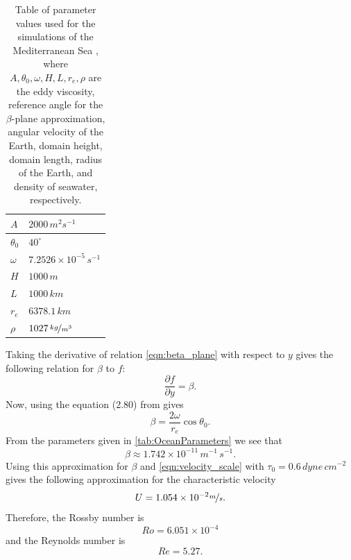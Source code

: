 \begin{table}
  \begin{center}
  \begin{tabular}{|l|l|}
    \hline
    $A$ & $2000\,m^2s^{-1}$\\
    \hline
    $\theta_0$ & $40^\circ$ \\
    \hline
    $\omega$ & $7.2526\times 10^{-5}\,s^{-1}$ \\
    \hline
    $H$ & $1000\,m$ \\
    \hline
    $L$ & $1000\,km$ \\
    \hline
    $r_e$ & $6378.1\,km$ \\
    \hline
    $\rho$ & $1027\, \nicefrac{kg}{m^3}$ \\
    \hline
  \end{tabular}
  \end{center}
  \caption{Table of parameter values used for the simulations of the
    Mediterranean Sea \cite{delSastre04}, where $A,\theta_0,\omega,H,L,r_e,\rho$ are the
    eddy viscosity, reference angle for the $\beta$-plane approximation, angular
    velocity of the Earth, domain height, domain length, radius of the Earth, and
    density of seawater, respectively.}
  \label{tab:OceanParameters}
\end{table}

Taking the derivative of relation \eqref{eqn:beta_plane} with respect to $y$
gives the following relation for $\beta$ to $f$:
\begin{equation}
  \frac{\partial f}{\partial y} = \beta. \label{eqn:dfdy}
\end{equation}
Now, using the equation (2.80) from \cite{Vallis} gives
\begin{equation}
  \beta = \frac{2\omega}{r_e}\cos \theta_0.
  \label{eqn:Beta}
\end{equation}
From the parameters given in \autoref{tab:OceanParameters} we see that
\begin{equation*}
  \beta \approx 1.742\times 10^{-11}\, m^{-1}\,s^{-1}.
\end{equation*}
Using this approximation for $\beta$ and \eqref{eqn:velocity_scale} with
$\tau_0 = 0.6\, dyne\, cm^{-2}$ \cite{Hellerman} gives the following
approximation for the characteristic velocity
\begin{equation*}
    U = 1.054\times 10^{-2} \nicefrac{m}{s}.
\end{equation*}
Therefore, the Rossby number is
\begin{equation*}
  Ro = 6.051\times 10^{-4}
\end{equation*}
and the Reynolds number is
\begin{equation*}
  Re = 5.27.
\end{equation*}

